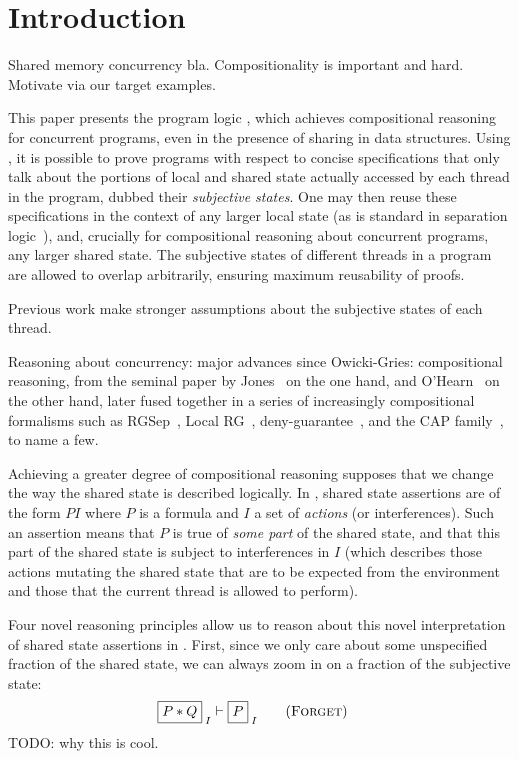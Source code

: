 \section{Introduction}

Shared memory concurrency bla.  Compositionality is important and
hard. Motivate via our target examples.

This paper presents the program logic \colosl, which achieves
compositional reasoning for concurrent programs, even in the presence
of sharing in data structures.  Using \colosl, it is possible to prove
programs with respect to concise specifications that only talk about
the portions of local and shared state actually accessed by each
thread in the program, dubbed their \emph{subjective states}.  One may
then reuse these specifications in the context of any larger local
state (as is standard in separation logic~\cite{rey02}), and,
crucially for compositional reasoning about concurrent programs, any
larger shared state. The subjective states of different threads in a
program are allowed to overlap arbitrarily, ensuring maximum
reusability of proofs.

Previous work make stronger assumptions about the subjective states of
each thread.

Reasoning about concurrency: major advances since Owicki-Gries:
compositional reasoning, from the seminal paper by Jones~\cite{rg} on
the one hand, and O'Hearn~\cite{csl-orig,csl-tcs} on the other hand,
later fused together in a series of increasingly compositional
formalisms such as RGSep~\cite{viktor-marriage}, Local RG~\cite{lrg},
deny-guarantee~\cite{dg}, and the CAP
family~\cite{cap-ecoop10,icap,tada}, to name a few.


Achieving a greater degree of compositional reasoning supposes that we
change the way the shared state is described logically.  In \colosl,
shared state assertions are of the form $\boxed P I$ where $P$ is a
formula and $I$ a set of \emph{actions} (or interferences). Such an
assertion means that $P$ is true of \emph{some part} of the shared
state, and that this part of the shared state is subject to
interferences in $I$ (which describes those actions mutating the
shared state that are to be expected from the environment and those
that the current thread is allowed to perform).

Four novel reasoning principles allow us to reason about this novel
interpretation of shared state assertions in \colosl. First, since we
only care about some unspecified fraction of the shared state, we can
always  zoom in on a fraction of the subjective state:
\begin{align*}
  \shared{P * Q}{I} &\vdash \shared{P}{I}  \tag{\textsc{Forget}}
\end{align*}
TODO: why this is cool.


